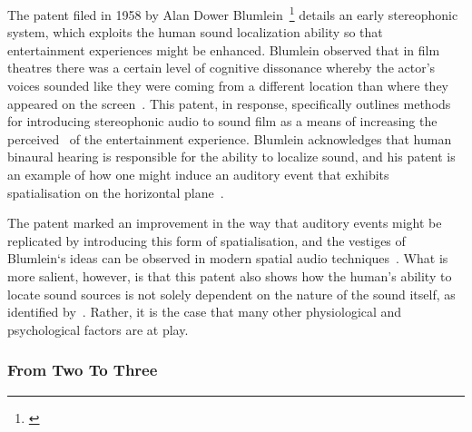 The patent filed in 1958 by Alan Dower Blumlein~\footnote{\citep{blumlein-patent}} details an early stereophonic system, which exploits the human sound localization ability so that entertainment experiences might be enhanced.
Blumlein observed that in film theatres there was a certain level of cognitive dissonance whereby the actor’s voices sounded like they were coming from a different location than where they appeared on the screen~\citep{alexander_blumlein}.
This patent, in response, specifically outlines methods for introducing stereophonic audio to sound film as a means of increasing the perceived~ of the entertainment experience.
Blumlein acknowledges that human binaural hearing is responsible for the ability to localize sound, and his patent is an example of how one might induce an auditory event that exhibits spatialisation on the horizontal plane~\citep{blumlein-patent}.


The patent marked an improvement in the way that auditory events might be replicated by introducing this form of spatialisation, and the vestiges of Blumlein`s ideas can be observed in modern spatial audio techniques~\citep{politis_spatial, beyer_acoustics}.
What is more salient, however, is that this patent also shows how the human’s ability to locate sound sources is not solely dependent on the nature of the sound itself, as identified by~\citet{blauert_spatial}.
Rather, it is the case that many other physiological and psychological factors are at play.

\subsubsection{From Two To Three}

